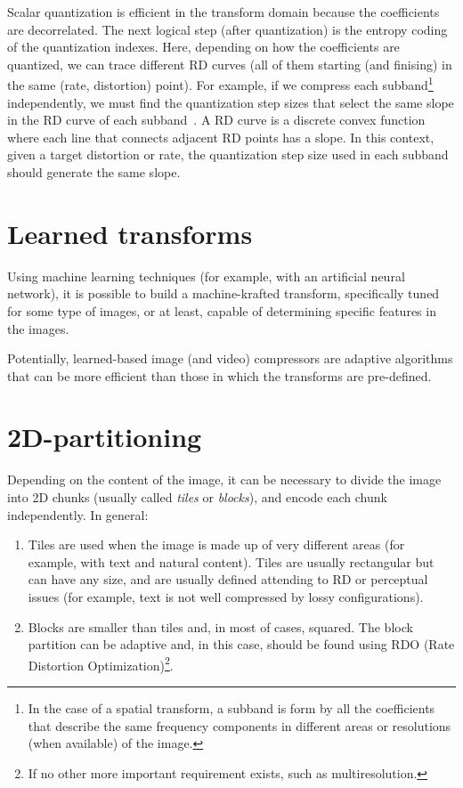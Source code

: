 Scalar quantization is efficient in the transform domain because the
coefficients are decorrelated. The next logical step (after
quantization) is the entropy coding of the quantization indexes. Here,
depending on how the coefficients are quantized, we can trace
different RD curves (all of them starting (and finising) in the same
(rate, distortion) point). For example, if we compress each
subband\footnote{In the case of a spatial transform, a subband is form
  by all the coefficients that describe the same frequency components
  in different areas or resolutions (when available) of the image.}
independently, we must find the quantization step sizes that select
the same slope in the RD curve of each
subband~\cite{vruiz__information_theory}. A RD curve is a discrete
convex function where each line that connects adjacent RD points has a
slope.  In this context, given a target distortion or rate, the
quantization step size used in each subband should generate the same
slope.


\section{Learned transforms}

Using machine learning techniques (for example, with an artificial
neural network), it is possible to build a machine-krafted transform,
specifically tuned for some type of images, or at least, capable of
determining specific features in the images.

Potentially, learned-based image (and video) compressors are adaptive
algorithms that can be more efficient than those in which the
transforms are pre-defined.


\section{2D-partitioning}

Depending on the content of the image, it can be necessary to divide
the image into 2D chunks (usually called \emph{tiles} or
\emph{blocks}), and encode each chunk independently. In general:
\begin{enumerate}
\item Tiles are used when the image is made up of very different areas
  (for example, with text and natural content). Tiles are usually
  rectangular but can have any size, and are usually defined attending
  to RD or perceptual issues (for example, text is not well compressed by
  lossy configurations).
\item Blocks are smaller than tiles and, in most of cases,
  squared. The block partition can be adaptive and, in this case,
  should be found using RDO (Rate Distortion Optimization)\footnote{If
    no other more important requirement exists, such as
    multiresolution.}.
\end{enumerate}

